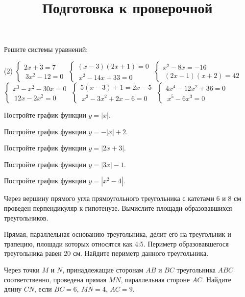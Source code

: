 \begin{class}[number=7]
	\title{Подготовка к проверочной}
	\begin{listofex}
		\item  Решите системы уравнений:
		\begin{tasks}(2)
			\task \( \begin{cases}
				2x+3=7 \\\ 3x^{2}-12=0
			\end{cases} \)
			\task \( \begin{cases}
				(x-3)(2x+1)=0 \\\ x^{2}-14x+33=0
			\end{cases} \)
			\task \( \begin{cases}
				x^{2}-8x=-16 \\\ (2x-1)(x+2)=42
			\end{cases} \)
			\task \( \begin{cases}
				x^{3}-x^{2}-30x=0\\\ 12x-2x^{2}=0
			\end{cases} \)
			\task \( \begin{cases}
				5(x-3)+1=2x-5\\\ x^{3}-3x^{2}+2x -6=0
			\end{cases} \)
			\task \( \begin{cases}
				4x^{4}-12x^{2}+36=0\\\ x^{5}-6x^{3}=0
			\end{cases} \)
		\end{tasks}
	\end{listofex}
\end{class}


\begin{consultation}[number=7]
	\begin{listofex}
		\item Постройте график функции \( y=|x| \).
		\item Постройте график функции \( y=-|x|+2 \).
		\item Постройте график функции \( y=|2x+3| \).
		\item Постройте график функции \( y=|3x|-1 \).
		\item Постройте график функции \( y=|x^{2}-4| \).
		\item Через вершину прямого угла прямоугольного треугольника с катетами 6 и 8 см проведен перпендикуляр к гипотенузе. Вычислите площади образовавшихся треугольников.
		\item Прямая, параллельная основанию треугольника, делит его на треугольник и трапецию, площади которых относятся как 4:5. Периметр образовавшегося треугольника равен 20 см. Найдите периметр данного треугольника.
		\item Через точки \( M \) и \( N \), принадлежащие сторонам \( AB \) и \( BC \) треугольника \( ABC \) соответственно, проведена прямая \( MN \), параллельная стороне \( AC \). Найдите длину \( CN \), если \( BC = 6 \), \( MN = 4 \), \( AC = 9 \).
	\end{listofex}
\end{consultation}


